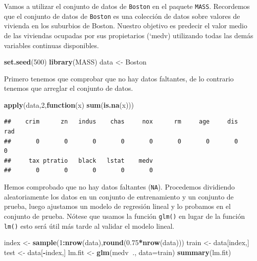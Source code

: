 \documentclass[]{book}
\newenvironment{Shaded}{\begin{snugshade}}{\end{snugshade}}
\newcommand{\KeywordTok}[1]{\textcolor[rgb]{0.13,0.29,0.53}{\textbf{#1}}}
\newcommand{\DataTypeTok}[1]{\textcolor[rgb]{0.13,0.29,0.53}{#1}}
\newcommand{\DecValTok}[1]{\textcolor[rgb]{0.00,0.00,0.81}{#1}}
\newcommand{\FloatTok}[1]{\textcolor[rgb]{0.00,0.00,0.81}{#1}}
\newcommand{\StringTok}[1]{\textcolor[rgb]{0.31,0.60,0.02}{#1}}
\newcommand{\ControlFlowTok}[1]{\textcolor[rgb]{0.13,0.29,0.53}{\textbf{#1}}}
\newcommand{\OperatorTok}[1]{\textcolor[rgb]{0.81,0.36,0.00}{\textbf{#1}}}
\newcommand{\NormalTok}[1]{#1}
\begin{document}
Vamos a utilizar el conjunto de datos de \texttt{Boston} en el paquete
\texttt{MASS}. Recordemos que el conjunto de datos de \texttt{Boston} es
una colección de datos sobre valores de vivienda en los suburbios de
Boston. Nuestro objetivo es predecir el valor medio de las viviendas
ocupadas por sus propietarios (`medv) utilizando todas las demás
variables continuas disponibles.

\begin{Shaded}
\begin{Highlighting}[]
\KeywordTok{set.seed}\NormalTok{(}\DecValTok{500}\NormalTok{)}
\KeywordTok{library}\NormalTok{(MASS)}
\NormalTok{data <-}\StringTok{ }\NormalTok{Boston}
\end{Highlighting}
\end{Shaded}

Primero tenemos que comprobar que no hay datos faltantes, de lo
contrario tenemos que arreglar el conjunto de datos.

\begin{Shaded}
\begin{Highlighting}[]
\KeywordTok{apply}\NormalTok{(data,}\DecValTok{2}\NormalTok{,}\ControlFlowTok{function}\NormalTok{(x) }\KeywordTok{sum}\NormalTok{(}\KeywordTok{is.na}\NormalTok{(x)))}
\end{Highlighting}
\end{Shaded}

\begin{verbatim}
##    crim      zn   indus    chas     nox      rm     age     dis     rad 
##       0       0       0       0       0       0       0       0       0 
##     tax ptratio   black   lstat    medv 
##       0       0       0       0       0
\end{verbatim}

Hemos comprobado que no hay datos faltantes (\texttt{NA}). Procedemos
dividiendo aleatoriamente los datos en un conjunto de entrenamiento y un
conjunto de prueba, luego ajustamos un modelo de regresión lineal y lo
probamos en el conjunto de prueba. Nótese que usamos la función
\texttt{glm()} en lugar de la función \texttt{lm()} esto será útil más
tarde al validar el modelo lineal.

\begin{Shaded}
\begin{Highlighting}[]
\NormalTok{index <-}\StringTok{ }\KeywordTok{sample}\NormalTok{(}\DecValTok{1}\OperatorTok{:}\KeywordTok{nrow}\NormalTok{(data),}\KeywordTok{round}\NormalTok{(}\FloatTok{0.75}\OperatorTok{*}\KeywordTok{nrow}\NormalTok{(data)))}
\NormalTok{train <-}\StringTok{ }\NormalTok{data[index,]}
\NormalTok{test <-}\StringTok{ }\NormalTok{data[}\OperatorTok{-}\NormalTok{index,]}
\NormalTok{lm.fit <-}\StringTok{ }\KeywordTok{glm}\NormalTok{(medv}\OperatorTok{~}\NormalTok{., }\DataTypeTok{data=}\NormalTok{train)}
\KeywordTok{summary}\NormalTok{(lm.fit)}
\end{Highlighting}
\end{Shaded}
\end{document}
